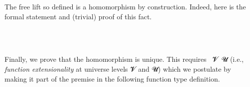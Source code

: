 The free lift so defined is a homomorphism by construction. Indeed, here is the formal
statement and (trivial) proof of this fact.
\ccpad
\begin{code}%
\>[1]\AgdaSpace{}%
\AgdaSymbol{:}\AgdaSpace{}%
\AgdaSymbol{(}\AgdaSpace{}%
\AgdaSymbol{:}\AgdaSpace{}%
\AgdaSpace{}%
\AgdaSpace{}%
\AgdaSymbol{)}\AgdaSpace{}%
\AgdaSpace{}%
\AgdaSymbol{(}\AgdaSpace{}%
\AgdaSpace{}%
\AgdaSpace{}%
\AgdaSpace{}%
\AgdaSymbol{)}\AgdaSpace{}%
\AgdaSpace{}%
\AgdaSpace{}%
\AgdaSymbol{(}\AgdaSpace{}%
\AgdaSymbol{)}\AgdaSpace{}%
\<%
\\
%
\\[\AgdaEmptyExtraSkip]%
%
\>[1]\AgdaSpace{}%
\AgdaSpace{}%
\AgdaSpace{}%
\AgdaSymbol{=}\AgdaSpace{}%
\AgdaSpace{}%
\AgdaSpace{}%
\AgdaSpace{}%
\AgdaOperator{\AgdaInductiveConstructor{,}}\AgdaSpace{}%
\AgdaSpace{}%
\AgdaSpace{}%
\AgdaSpace{}%
\AgdaSpace{}%
\AgdaSpace{}%
\AgdaSymbol{(}\AgdaSpace{}%
\AgdaSpace{}%
\AgdaSymbol{)}\AgdaSpace{}%
\<%
\end{code}
\ccpad
Finally, we prove that the homomorphism is unique.  This requires
~\ab 𝓥~\ab 𝓤 (i.e., \emph{function extensionality} at universe levels
\ab 𝓥 and \ab 𝓤) which we postulate by making it part of the premise in the
following function type definition.
\ccpad
